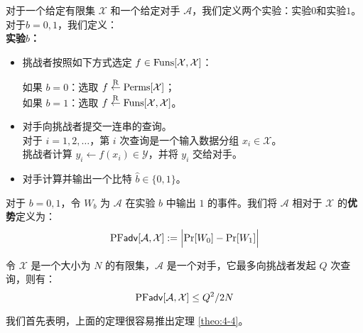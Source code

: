 \begin{game}[置换 \emph{vs.} 函数]\label{game:4-3}
对于一个给定有限集 $\mathcal{X}$ 和一个给定对手 $\mathcal{A}$，我们定义两个实验：实验$0$和实验$1$。对于$b=0,1$，我们定义：\\
\textbf{实验$b$：}
\begin{itemize}
	\item 挑战者按照如下方式选定 $f\in{\rm Funs}[\mathcal{X},\mathcal{X}]$：
	\vspace{1pt}
	
	\hspace*{5pt} 如果 $b=0$：选取 $f\overset{\rm R}\leftarrow{\rm Perms}[\mathcal{X}]$；\\
	\hspace*{5pt} 如果 $b=1$：选取 $f\overset{\rm R}\leftarrow{\rm Funs}[\mathcal{X},\mathcal{X}]$。
	\item 对手向挑战者提交一连串的查询。\\
	对于 $i=1,2,\dots$，第 $i$ 次查询是一个输入数据分组 $x_i\in\mathcal{X}$。\\
	挑战者计算 $y_i\leftarrow f(x_i)\in\mathcal{Y}$，并将 $y_i$ 交给对手。
	\item 对手计算并输出一个比特 $\hat{b}\in\{0,1\}$。
\end{itemize}

对于 $b=0,1$，令 $W_b$ 为 $\mathcal{A}$ 在实验 $b$ 中输出 $1$ 的事件。我们将 $\mathcal{A}$ 相对于 $\mathcal{X}$ 的\textbf{优势}定义为：
\[
{\rm PF\mathsf{adv}}[\mathcal{A}, \mathcal{X}]:=
\Big\lvert
{\rm Pr}[W_0]-{\rm Pr}[W_1]
\Big\rvert
\]
\end{game}

\begin{theorem}\label{theo:4-6}
令 $\mathcal{X}$ 是一个大小为 $N$ 的有限集，$\mathcal{A}$ 是一个对手，它最多向挑战者发起 $Q$ 次查询，则有：
\[
{\rm PF\mathsf{adv}}[\mathcal{A},\mathcal{X}]\leq{Q^2}/{2N}
\]
\end{theorem}


我们首先表明，上面的定理很容易推出定理 \ref{theo:4-4}。

